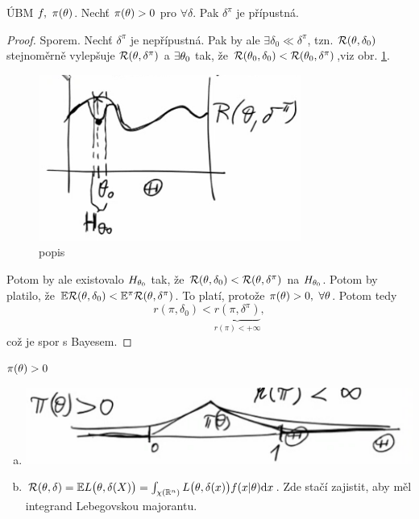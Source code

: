 \begin{theorem}
	ÚBM $f,~\pi(\theta)$. Nechť $\pi(\theta)>0$ pro $\forall\delta$. Pak $\delta^\pi$ je přípustná.
	\begin{proof}
		Sporem. Nechť $\delta^\pi$ je nepřípustná. Pak by ale $\exists\delta_0\ll\delta^\pi$, tzn. $\mathcal{R}(\theta,\delta_0)$ stejnoměrně vylepšuje $\mathcal{R}(\theta,\delta^\pi)$ a $\exists\theta_0$ tak, že $\mathcal{R}(\theta_0,\delta_0)<\mathcal{R}(\theta_0,\delta^\pi)$,viz obr. \ref{fig:26}.
		\begin{figure}[h]
			\centering
			\includegraphics[width=0.5\linewidth]{pictures/26.11}
			\caption{popis}
			\label{fig:26}
		\end{figure}
		Potom by ale existovalo $H_{\theta_0}$ tak, že $\mathcal{R}(\theta,\delta_0)<\mathcal{R}(\theta,\delta^\pi)$ na $H_{\theta_0}$. Potom by platilo, že $\mathbb{E} \mathcal{R}(\theta,\delta_0)<\mathbb{E}^\pi \mathcal{R}(\theta,\delta^\pi)$. To platí, protože $\pi(\theta)>0,~\forall\theta$. Potom tedy 
		$$ r(\pi,\delta_0)<\underbrace{r(\pi,\delta^\pi)}_{r(\pi)<+\infty},$$ což je spor s Bayesem.
	\end{proof} 
\end{theorem}
\begin{remark}
	$\pi(\theta)>0$
\begin{enumerate}[a)]
	\item 	\begin{center}
			\includegraphics[width=0.5\linewidth]{pictures/26.11-2}
	\end{center}
\item $\mathcal{R}(\theta,\delta)=\mathbb{E} L\big(\theta,\delta(X)\big)=\int_{\chi(\mathbb{R}^n)}L\big(\theta,\delta(x)\big)f(x|\theta)\mathrm{d} x$. Zde stačí zajistit, aby měl integrand Lebegovskou majorantu.
\end{enumerate}

\end{remark}
